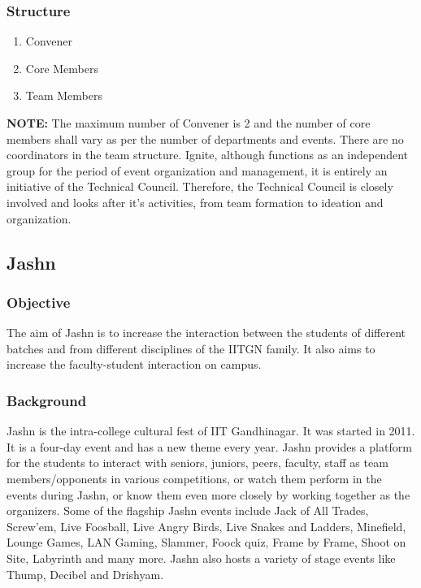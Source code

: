 \documentclass[12pt]{article}
\begin{document}
\subsubsection{Structure}
\begin{enumerate}
    \item Convener
    \item Core Members
    \item Team Members
\end{enumerate}
\textbf{NOTE:} The maximum number of Convener is 2 and the number of core members shall vary as per the number of departments and events. There are no coordinators in the team structure. Ignite, although functions as an independent group for the period of event organization and management, it is entirely an initiative of the Technical Council. Therefore, the Technical Council is closely involved and looks after it's activities, from team formation to ideation and organization.


\subsection{Jashn}
\subsubsection{Objective}
The aim of Jashn is to increase the interaction between the students of different batches and from different disciplines of the IITGN family. It also aims to increase the faculty-student interaction on campus.

\subsubsection{Background}
Jashn is the intra-college cultural fest of IIT Gandhinagar. It was started in 2011. It is a four-day event and has a new theme every year. Jashn provides a platform for the students to interact with seniors, juniors, peers, faculty, staff as team members/opponents in various competitions, or watch them perform in the events during Jashn, or know them even more closely by working together as the organizers. Some of the flagship Jashn events include Jack of All Trades, Screw’em, Live Foosball, Live Angry Birds, Live Snakes and Ladders, Minefield, Lounge Games, LAN Gaming, Slammer, Foock quiz, Frame by Frame, Shoot on Site, Labyrinth and many more. Jashn also hosts a variety of stage events like Thump, Decibel and Drishyam.
\end{document}
